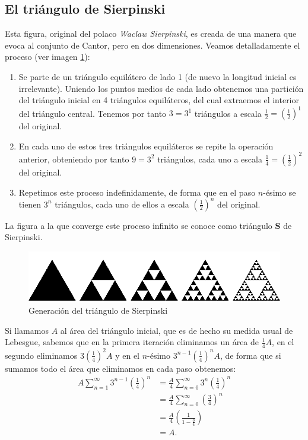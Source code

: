 \subsection{El triángulo de Sierpinski}
\label{subsection:triangulo-Sierpinski} 

Esta figura, original del polaco \textit{Waclaw Sierpinski}, es creada de una manera que evoca al conjunto de Cantor, pero en dos dimensiones. Veamos detalladamente el proceso (ver imagen \ref{fig:triangulo-Sierpinski}):

\begin{enumerate}
\item Se parte de un triángulo equilátero de lado 1 (de nuevo la longitud inicial es irrelevante). Uniendo los puntos medios de cada lado obtenemos una partición del triángulo inicial en 4 triángulos equiláteros, del cual extraemos el interior del triángulo central. Tenemos por tanto $3=3^1$ triángulos a escala $\frac 1 2 = \left(\frac 1 2\right)^1$ del original.

\item En cada uno de estos tres triángulos equiláteros se repite la operación anterior, obteniendo por tanto $9=3^2$ triángulos, cada uno a escala $\frac 1 4 = \left(\frac 1 2\right)^2$ del original.

\item Repetimos este proceso indefinidamente, de forma que en el paso $n$-ésimo se tienen $3^n$ triángulos, cada uno de ellos a escala $\left(\frac 1 2\right)^n$ del original.
\end{enumerate}

La figura a la que converge este proceso infinito se conoce como triángulo \textbf{S} de Sierpinski.

\begin{figure} [ht]
\centering
\includegraphics[scale = 0.6]{img/Sierpinski-triangle.png}
\caption{Generación del triángulo de Sierpinski}
 \label{fig:triangulo-Sierpinski}
\end{figure}

Si llamamos $A$ al área del triángulo inicial, que es de hecho su medida usual de Lebesgue, sabemos que en la primera iteración eliminamos un área de $\frac 1 4 A$, en el segundo eliminamos $3 \left(\frac 1 4\right)^2 A$ y en el $n$-ésimo $3^{n-1}\left(\frac 1 4\right)^n A$, de forma que si sumamos todo el área que eliminamos en cada paso obtenemos:
\begin{equation*}
  \begin{split}
    A \sum_{n=1}^\infty 3^{n-1}\left(\frac 1 4\right)^n  &= \frac A 4  \sum_{n=0}^\infty 3^n\left(\frac 1 4\right)^n \\
    &=  \frac A 4  \sum_{n=0}^\infty \left(\frac 3 4\right)^n\\
    &= \frac{A}{4} \left(\frac{1}{1-\frac{3}{4}}\right) \\
    &= A.
  \end{split}
\end{equation*}

